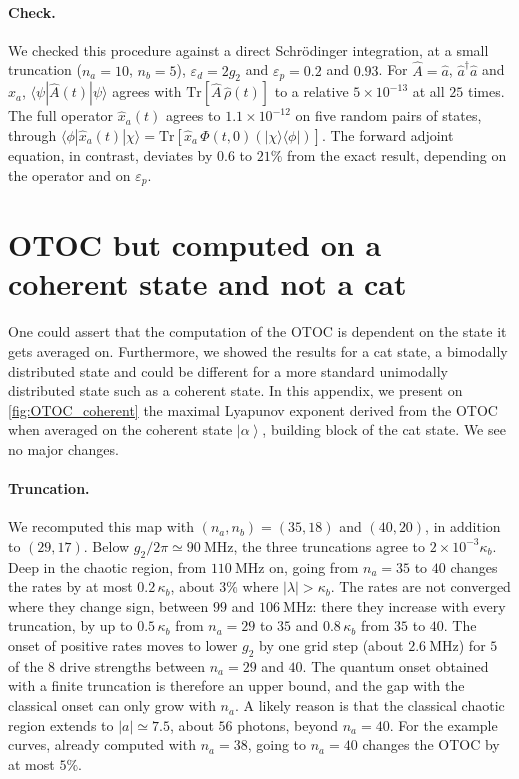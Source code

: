 \documentclass[aps,prx,reprint,floatfix,amsmath,amssymb,longbibliography]{revtex4-2}
\newcommand{\ket}[1]{\left|#1\right\rangle}
\newcommand{\eps}{\varepsilon}
\newcommand{\da}{^\dagger}
\newcommand{\ha}{\hat{a}}
\begin{document}
\paragraph*{Check.}
We checked this procedure against a direct Schrödinger integration, at a small truncation ($n_a=10$, $n_b=5$), $\eps_d=2g_2$ and $\eps_p=0.2$ and $0.93$. For $\hat A=\ha$, $\ha\da\ha$ and $\hat x_a$, $\langle\psi|\hat A(t)|\psi\rangle$ agrees with $\mathrm{Tr}[\hat A\,\hat\rho(t)]$ to a relative $5\times10^{-13}$ at all $25$ times. The full operator $\hat x_a(t)$ agrees to $1.1\times10^{-12}$ on five random pairs of states, through $\langle\phi|\hat x_a(t)|\chi\rangle=\mathrm{Tr}[\hat x_a\,\Phi(t,0)(|\chi\rangle\langle\phi|)]$. The forward adjoint equation, in contrast, deviates by $0.6$ to $21\%$ from the exact result, depending on the operator and on $\eps_p$.

\section{OTOC but computed on a coherent state and not a cat}
\label{app:OTOC_coherent}

One could assert that the computation of the OTOC is dependent on the state it gets averaged on. Furthermore, we showed the results for a cat state, a bimodally distributed state and could be different for a more standard unimodally distributed state such as a coherent state. In this appendix, we present on \cref{fig:OTOC_coherent} the maximal Lyapunov exponent derived from the OTOC when averaged on the coherent state $\ket{\alpha}$, building block of the cat state. We see no major changes.

\paragraph*{Truncation.}
We recomputed this map with $(n_a,n_b)=(35,18)$ and $(40,20)$, in addition to $(29,17)$. Below $g_2/2\pi\simeq90~\mathrm{MHz}$, the three truncations agree to $2\times10^{-3}\kappa_b$. Deep in the chaotic region, from $110~\mathrm{MHz}$ on, going from $n_a=35$ to $40$ changes the rates by at most $0.2\,\kappa_b$, about $3\%$ where $|\lambda|>\kappa_b$. The rates are not converged where they change sign, between $99$ and $106~\mathrm{MHz}$: there they increase with every truncation, by up to $0.5\,\kappa_b$ from $n_a=29$ to $35$ and $0.8\,\kappa_b$ from $35$ to $40$. The onset of positive rates moves to lower $g_2$ by one grid step (about $2.6~\mathrm{MHz}$) for $5$ of the $8$ drive strengths between $n_a=29$ and $40$. The quantum onset obtained with a finite truncation is therefore an upper bound, and the gap with the classical onset can only grow with $n_a$. A likely reason is that the classical chaotic region extends to $|a|\simeq7.5$, about $56$ photons, beyond $n_a=40$. For the example curves, already computed with $n_a=38$, going to $n_a=40$ changes the OTOC by at most $5\%$.
\end{document}
